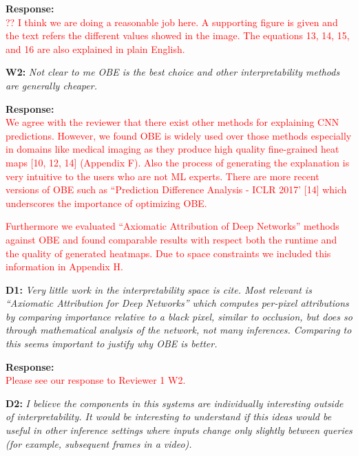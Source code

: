 \documentclass[preprint]{vldb}
\newcommand{\red}{\textcolor{red}}
\begin{document}
\vspace{2mm}
\noindent \textbf{Response:}\\
\red{?? I think we are doing a reasonable job here. A supporting figure is given and the text refers the different values showed in the image. The equations 13, 14, 15, and 16 are also explained in plain English.}

\vspace{2mm}
\noindent \textbf{W2:} \textit{Not clear to me OBE is the best choice and other interpretability methods are generally cheaper.}

\vspace{2mm}
\noindent \textbf{Response:} \\
\red{
We agree with the reviewer that there exist other methods for explaining CNN predictions. However, we found OBE is widely used over those methods especially in domains like medical imaging as they produce high quality fine-grained heat maps [10, 12, 14] (Appendix F).
Also the process of generating the explanation is very intuitive to the users who are not ML experts.
There are more recent versions of OBE such as ``Prediction Difference Analysis - ICLR 2017' [14] which underscores the importance of optimizing OBE.}

\red{
Furthermore we evaluated ``Axiomatic Attribution of Deep Networks'' methods against OBE and found comparable results with respect both the runtime and the quality of generated heatmaps.
Due to space constraints we included this information in Appendix H. 
}

\vspace{2mm}
\noindent \textbf{D1:} \textit{Very little work in the interpretability space is cite. Most relevant is ``Axiomatic Attribution for Deep Networks'' which computes per-pixel attributions by comparing importance relative to a black pixel, similar to occlusion, but does so through mathematical analysis of the network, not many inferences. Comparing to this seems important to justify why OBE is better.}

\vspace{2mm}
\noindent \textbf{Response:} \\
\red{Please see our response to Reviewer 1 W2.}

\vspace{2mm}
\noindent \textbf{D2:} \textit{I believe the components in this systems are individually interesting outside of interpretability. It would be interesting to understand if this ideas would be useful in other inference settings where inputs change only slightly between queries (for example, subsequent frames in a video).}
\end{document}
